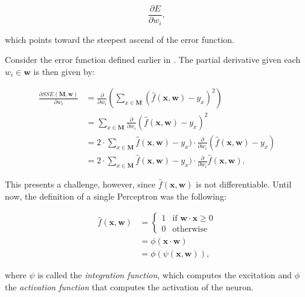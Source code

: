 \begin{equation}
    \frac{\partial E}{\partial w_i},
\end{equation}

which points toward the steepest ascend of the error function.

Consider the error function defined earlier in .
The partial derivative given each $w_i \in \bm{w}$ is then given by:

\begin{equation}
    \label{eq:error-derivative-1}
    \begin{split}
        \frac{\partial SSE(\bm{M}, \bm{w})}{\partial w_i}
        &= \frac{\partial }{\partial w_i} \left( \sum_{x \in \bm{M}} (\hat{f}(\bm{x},\bm{w}) - y_x)^2 \right) \\
        &= \sum_{x \in \bm{M}} \frac{\partial }{\partial w_i} (\hat{f}(\bm{x},\bm{w}) - y_x)^2 \\
        &= 2 \cdot \sum_{x \in \bm{M}} \hat{f}(\bm{x},\bm{w}) - y_x) \cdot  \frac{\partial }{\partial w_i} (\hat{f}(\bm{x}, \bm{w}) - y_x) \\
        &= 2 \cdot \sum_{x \in \bm{M}} \hat{f}(\bm{x},\bm{w}) - y_x) \cdot  \frac{\partial }{\partial w_i} \hat{f}(\bm{x}, \bm{w}).
    \end{split}
\end{equation}

This presents a challenge, however, since $\hat{f}(\bm{x}, \bm{w})$ is not differentiable.
Until now, the definition of a single Perceptron was the following:

\begin{equation}
    \begin{split}
        \hat{f}(\bm{x}, \bm{w})
        &=
            \begin{cases}
                1 & \text{if } \bm{w} \cdot \bm{x} \geq 0 \\
                0 & \text{otherwise}
            \end{cases}
        \\
        &= \phi(\bm{x} \cdot \bm{w})
        \\
        &= \phi(\psi(\bm{x}, \bm{w})),
    \end{split}
\end{equation}

where $\psi$ is called the \textit{integration function}, which computes the excitation and $\phi$ the \textit{activation function} that computes the activation of the neuron.

